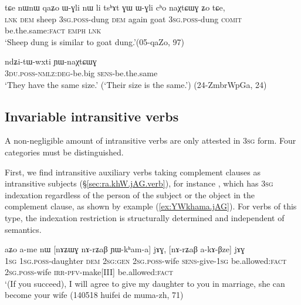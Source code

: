\begin{exe}
\ex   \label{ex:WGli.cho.naXtCWG}
 \gll   tɕe nɯnɯ qaʑo ɯ-ɣli nɯ li tsʰɤt ɣɯ ɯ-ɣli cʰo naχtɕɯɣ ʑo tɕe, \\
\textsc{lnk} \textsc{dem} sheep \textsc{3sg}.\textsc{poss}-dung \textsc{dem} again goat \textsc{3sg}.\textsc{poss}-dung \textsc{comit} be.the.same:\textsc{fact} \textsc{emph} \textsc{lnk} \\
\glt `Sheep dung is similar to goat dung.'(05-qaZo, 97)
  \end{exe}

\begin{exe}
\ex   \label{ex:ndZitWwxti.YWnaXtCWG}
\gll  ndʑi-tɯ-wxti ɲɯ-naχtɕɯɣ \\
\textsc{3du}.\textsc{poss}-\textsc{nmlz}:\textsc{deg}-be.big \textsc{sens}-be.the.same \\
\glt `They have the same size.' (`Their size is the same.') (24-ZmbrWpGa, 24)
\end{exe}

\subsection{Invariable intransitive verbs} \label{sec:intransitive.invariable}
A non-negligible amount of intransitive verbs are only attested in \textsc{3sg} form. Four categories must be distinguished. 

First, we find intransitive auxiliary verbs taking complement clauses as intransitive subjects (§\ref{sec:ra.khW.jAG.verb}), for instance , which has \textsc{3sg} indexation regardless of the person of the subject or the object in the complement clause, as shown by example (\ref{ex:YWkhama.jAG}). For verbs of this type, the indexation restriction is structurally determined and independent of semantics.

\begin{exe}
\ex   \label{ex:YWkhama.jAG}
\gll aʑo a-me nɯ [nɤʑɯɣ nɤ-rʑaβ ɲɯ-kʰam-a] jɤɣ, [nɤ-rʑaβ a-kɤ-βze] jɤɣ \\
\textsc{1sg} \textsc{1sg}.\textsc{poss}-daughter \textsc{dem} \textsc{2sg}:\textsc{gen} \textsc{2sg}.\textsc{poss}-wife \textsc{sens}-give-\textsc{1sg} be.allowed:\textsc{fact} \textsc{2sg}.\textsc{poss}-wife \textsc{irr}-\textsc{pfv}-make[III] be.allowed:\textsc{fact} \\
\glt `(If you succeed), I will agree to give my daughter to you in marriage, she can become your wife (140518 huifei de muma-zh, 71)
\end{exe}


